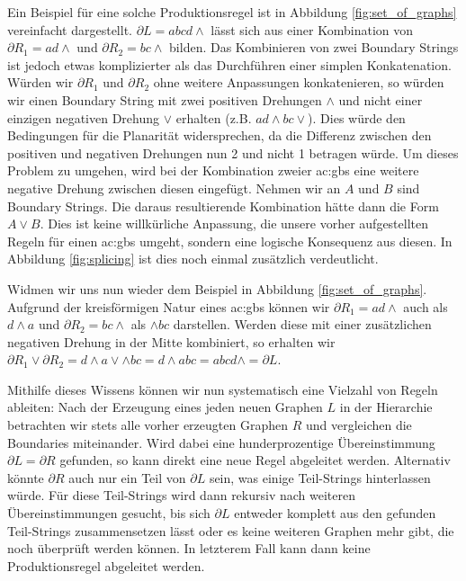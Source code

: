 Ein Beispiel für eine solche Produktionsregel ist in Abbildung \ref{fig:set_of_graphs} vereinfacht dargestellt. \(\partial L = abcd\wedge\) lässt sich aus
einer Kombination von \(\partial R_1 = ad\wedge\) und \(\partial R_2 = bc\wedge\) bilden. Das Kombinieren von zwei Boundary Strings ist jedoch etwas komplizierter
als das Durchführen einer simplen Konkatenation. Würden wir \(\partial R_1\) und \(\partial R_2\) ohne weitere Anpassungen konkatenieren, so würden wir
einen Boundary String mit zwei positiven Drehungen \(\wedge\) und nicht einer einzigen negativen Drehung \(\vee\) erhalten (z.B. \(a d \wedge b c \vee\)).
Dies würde den Bedingungen für die Planarität widersprechen, da die Differenz zwischen den positiven und negativen Drehungen nun 2 und nicht 1 betragen würde.
Um dieses Problem zu umgehen, wird bei der Kombination zweier \gls{ac:gbs} eine weitere negative Drehung zwischen diesen eingefügt. Nehmen wir an \(A\)
und \(B\) sind Boundary Strings. Die daraus resultierende Kombination hätte dann die Form \(A \vee B\). Dies ist keine willkürliche Anpassung, die
unsere vorher aufgestellten Regeln für einen \gls{ac:gbs} umgeht, sondern eine logische Konsequenz aus diesen. In Abbildung \ref{fig:splicing} ist dies noch einmal
zusätzlich verdeutlicht.

Widmen wir uns nun wieder dem Beispiel in Abbildung \ref{fig:set_of_graphs}. Aufgrund der kreisförmigen Natur eines \gls{ac:gbs} können wir
\(\partial R_1 = ad\wedge\) auch als \(d\wedge a\) und \(\partial R_2 = bc\wedge\) als \(\wedge bc\) darstellen. Werden diese mit einer zusätzlichen
negativen Drehung in der Mitte kombiniert, so erhalten wir \(\partial R_1 \vee \partial R_2 = d\wedge a\vee \wedge bc = d\wedge abc = abcd\wedge = \partial L\).

Mithilfe dieses Wissens können wir nun systematisch eine Vielzahl von Regeln ableiten:
Nach der Erzeugung eines jeden neuen Graphen \(L\) in der Hierarchie betrachten wir stets alle vorher erzeugten Graphen \(R\) und vergleichen die Boundaries
miteinander. Wird dabei eine hunderprozentige Übereinstimmung \(\partial L = \partial R\) gefunden, so kann direkt eine neue Regel abgeleitet werden.
Alternativ könnte \(\partial R\) auch nur ein Teil von \(\partial L\) sein, was einige Teil-Strings hinterlassen würde. Für diese Teil-Strings wird dann
rekursiv nach weiteren Übereinstimmungen gesucht, bis sich \(\partial L \) entweder komplett aus den gefunden Teil-Strings zusammensetzen lässt oder
es keine weiteren Graphen mehr gibt, die noch überprüft werden können. In letzterem Fall kann dann keine Produktionsregel abgeleitet werden.

